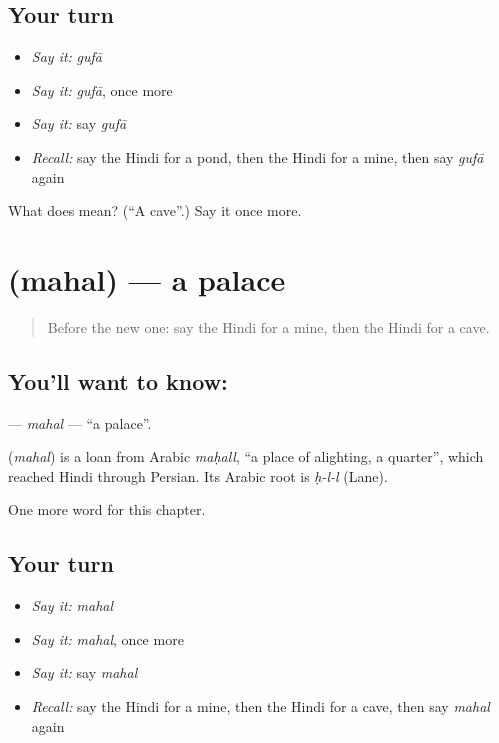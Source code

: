 \subsection*{Your turn}
\begin{itemize}
\raggedright
  \item \emph{Say it:} \emph{gufā}
  \item \emph{Say it:} \emph{gufā}, once more
  \item \emph{Say it:} say \emph{gufā}
  \item \emph{Recall:} say the Hindi for a pond, then the Hindi for a mine, then say \emph{gufā} again
\end{itemize}

\begin{tcolorbox}[breakable,colback=teal!4,colframe=teal!35!black,title={Before you move on}]
What does  mean? (\textquotedblleft{}A cave\textquotedblright{}.) Say it once more.
\end{tcolorbox}
\section[\texorpdfstring{\hi{महल} (mahal)}{महल (mahal)}]{ (mahal) — a palace}

\label{lesson:HI-C202-mahal}



\begin{quote}
Before the new one: say the Hindi for a mine, then the Hindi for a cave.
\end{quote}

\subsection*{You'll want to know: }
\textbf{} — \emph{mahal} — \textquotedblleft{}a palace\textquotedblright{}.

\begin{cousinweb}
\textbf{} (\emph{mahal}) is a loan from Arabic \emph{maḥall}, \textquotedblleft{}a place of alighting, a quarter\textquotedblright{}, which reached Hindi through Persian. Its Arabic root is \emph{ḥ-l-l} (Lane).
\end{cousinweb}

\begin{grammarlens}[title={What you've built}]
One more word for this chapter.
\end{grammarlens}

\subsection*{Your turn}
\begin{itemize}
\raggedright
  \item \emph{Say it:} \emph{mahal}
  \item \emph{Say it:} \emph{mahal}, once more
  \item \emph{Say it:} say \emph{mahal}
  \item \emph{Recall:} say the Hindi for a mine, then the Hindi for a cave, then say \emph{mahal} again
\end{itemize}

